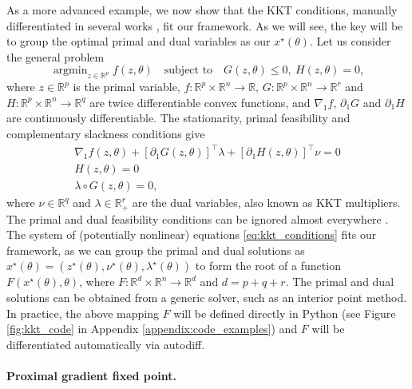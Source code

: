 \documentclass{article}
\def\RR{{\mathbb R}}
\DeclareMathOperator*{\argmin}{argmin}
\begin{document}
As a more advanced example,
we now show that the KKT conditions, manually differentiated in several works 
\cite{chapelle_2002,gould_2016,amos_2017,sparsemap,lp_sparsemap}, fit
our framework. As we will see, the key will be to group the
optimal primal and dual variables as our $x^\star(\theta)$.
Let us consider the general problem
\begin{equation}
\argmin_{z \in \RR^p} f(z, \theta)
\quad \text{subject to} \quad
G(z, \theta) \le 0,
~ H(z, \theta) = 0,
\label{eq:generic_constrained_pb}
\end{equation}
where $z \in \RR^p$ is the primal variable,
$f \colon \RR^p \times \RR^n \to \RR$,
$G \colon \RR^p \times \RR^n \to \RR^r$
and $H \colon \RR^p \times \RR^n \to \RR^q$
are twice differentiable convex functions, and $\nabla_1 f$, $\partial_1 G$ and $\partial_1 H$ are continuously differentiable.
The stationarity, primal feasibility and complementary slackness conditions give
\begin{align}
\nabla_1 f(z, \theta) + [\partial_1 G(z, \theta)]^\top \lambda + 
[\partial_1 H(z, \theta)]^\top \nu = 0 \\
H(z, \theta) = 0 \\
\lambda \circ G(z, \theta) = 0,
\label{eq:kkt_conditions}
\end{align}
where $\nu \in \RR^q$ and $\lambda \in \RR^r_+$ are the dual variables, also
known as KKT multipliers.
The primal and dual feasibility conditions can be ignored almost everywhere
\cite{tutorial_implicit}.
The system of (potentially nonlinear) equations \eqref{eq:kkt_conditions}
fits our framework, as we can group the primal and dual solutions as
$x^\star(\theta) = (z^\star(\theta), \nu^\star(\theta), \lambda^\star(\theta))$
to form the root of a function $F(x^\star(\theta), \theta)$, where $F \colon
\RR^d \times \RR^n \to \RR^d$ and $d = p + q + r$. The primal and dual solutions
can be obtained from a generic solver, such as an interior point method.
In practice, the above mapping $F$ will be defined directly in Python
(see Figure \ref{fig:kkt_code} in Appendix \ref{appendix:code_examples}) and
$F$ will be differentiated automatically via autodiff.

\paragraph{Proximal gradient fixed point.}
\end{document}
